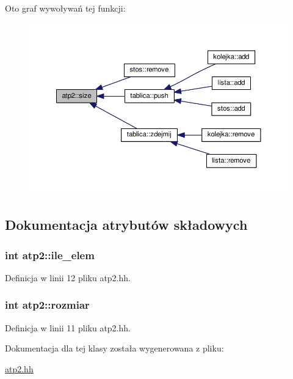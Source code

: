 Oto graf wywoływań tej funkcji\+:\nopagebreak
\begin{figure}[H]
\begin{center}
\leavevmode
\includegraphics[width=350pt]{classatp2_a0e7d193d25b0fac224510a370f5c983c_icgraph}
\end{center}
\end{figure}




\subsection{Dokumentacja atrybutów składowych}
\hypertarget{classatp2_a828948e16464b141d5f59a1f7888b99c}{}
\subsubsection[{ile\+\_\+elem}]{\setlength{\rightskip}{0pt plus 5cm}int atp2\+::ile\+\_\+elem\hspace{0.3cm}{\ttfamily [protected]}}\label{classatp2_a828948e16464b141d5f59a1f7888b99c}


Definicja w linii 12 pliku atp2.\+hh.

\hypertarget{classatp2_ab3dacfa1deb791529f6facb16f6277c8}{}
\subsubsection[{rozmiar}]{\setlength{\rightskip}{0pt plus 5cm}int atp2\+::rozmiar\hspace{0.3cm}{\ttfamily [protected]}}\label{classatp2_ab3dacfa1deb791529f6facb16f6277c8}


Definicja w linii 11 pliku atp2.\+hh.



Dokumentacja dla tej klasy została wygenerowana z pliku\+:\begin{DoxyCompactItemize}
\item 
\hyperlink{atp2_8hh}{atp2.\+hh}\end{DoxyCompactItemize}
